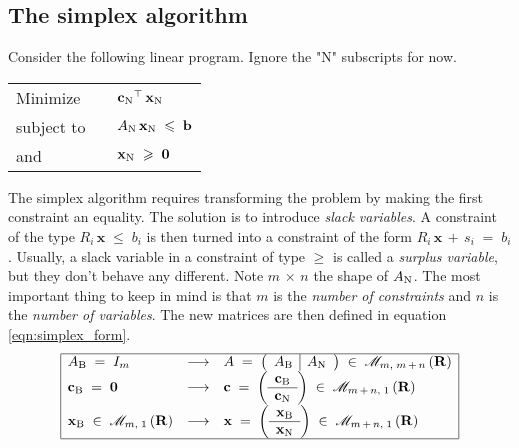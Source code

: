 \documentclass{report}
\theoremstyle{definition}
\theoremstyle{plain}
\begin{document}
\subsection{The simplex algorithm}
Consider the following linear program. Ignore the "N" subscripts for now.
\begin{center}
	\begin{tabular}{|lll|}
		\hline
		Minimize & & $\mathbf {c_{\rm N}}^\top\,\mathbf x_{\rm N}$ \\
		subject to & & $A_{\rm N}\,\mathbf x_{\rm N}\;\leqslant\;\mathbf b$ \\
		and & & $\mathbf x_{\rm N}\;\geqslant\;\mathbf 0$ \\
		\hline
	\end{tabular}
\end{center}
The simplex algorithm requires transforming the problem by making the first
constraint an equality. The solution is to introduce \emph{slack variables}. A
constraint of the type $R_i\,\mathbf x\;\leqslant\;b_i$ is then turned into a
constraint of the form $R_i\,\mathbf x\,+\,s_i\;=\;b_i$. Usually, a slack
variable in a constraint of type $\geqslant$ is called a \emph{surplus
variable}, but they don't behave any different. Note $m\,\times\,n$ the shape
of $A_{\rm N}$. The most important thing to keep in mind is that $m$ is the
\emph{number of constraints} and $n$ is the \emph{number of variables}. The new
matrices are then defined in equation \ref{eqn:simplex_form}.
\begin{equation}
	\begin{array}{|lcl|}
		\hline
		A_{\rm B}\;=\;I_m & \longrightarrow &
			A\;=\;\left(\begin{array}{c|c}
				A_{\rm B} & A_{\rm N}
			\end{array}\right)\;\in\;
				\mathscr M_{m,\;m\,+\,n}
					\left(\mathbf R\right) \\
		\mathbf c_{\rm B}\;=\;\mathbf 0 & \longrightarrow &
			\mathbf c\;=\;\left(\begin{array}{c}
				\mathbf c_{\rm B} \\
				\hline
				\mathbf c_{\rm N}
			\end{array}\right)\;\in\;
				\mathscr M_{m\,+\,n,\;1}
					\left(\mathbf R\right) \\
		\mathbf x_{\rm B}\;\in\;\mathscr M_{m,\;1}\left(\mathbf R\right)
			& \longrightarrow &
			\mathbf x\;=\;\left(\begin{array}{c}
				\mathbf x_{\rm B} \\
				\hline
				\mathbf x_{\rm N}
			\end{array}\right)\;\in\;
				\mathscr M_{m\,+\,n,\;1}
					\left(\mathbf R\right) \\
		\hline
	\end{array}
	\label{eqn:simplex_form}
\end{equation}
\end{document}

